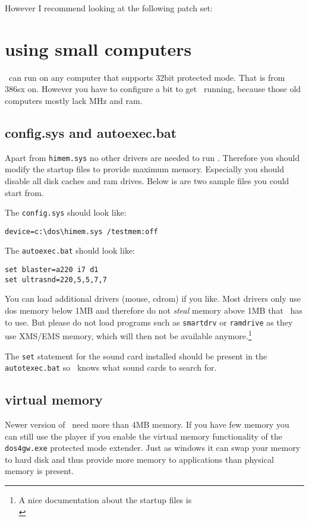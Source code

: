 However I recommend looking at the following patch set:\\

\section{using small computers}
\cp\ can run on any computer that supports 32bit protected mode. That is from
386sx on. However you have to configure a bit to get \cp\ running, because
those old computers mostly lack MHz and ram.

\subsection{config.sys and autoexec.bat}
Apart from \texttt{himem.sys} no other drivers are needed to run \cp. Therefore
you should modify the startup files to provide maximum memory. Especially you
should disable all disk caches and ram drives. Below is are two sample files
you could start from.

The \texttt{config.sys} should look like:
\begin{verbatim}
device=c:\dos\himem.sys /testmem:off
\end{verbatim}

The \texttt{autoexec.bat} should look like:
\begin{verbatim}
set blaster=a220 i7 d1
set ultrasnd=220,5,5,7,7
\end{verbatim}

You can load additional drivers (mouse, cdrom) if you like. Most drivers only use dos memory
below 1MB and therefore do not \emph{steal} memory above 1MB that \cp\ has to
use. But please do not load programs such as \texttt{smartdrv} or
\texttt{ramdrive} as they use XMS/EMS memory, which will then not be available
anymore.\footnote{A nice documentation about the startup files is \\
}

The \texttt{set} statement for the sound card installed should be present in
the \texttt{autotexec.bat} so \cp\ knows what sound cards to search for.

\subsection{virtual memory}
Newer version of \cp\ need more than 4MB memory. If you have few memory you
can still use the player if you enable the virtual memory functionality of
the \texttt{dos4gw.exe} protected mode extender. Just as windows it can swap
your memory to hard disk and thus provide more memory to applications than
physical memory is present.

